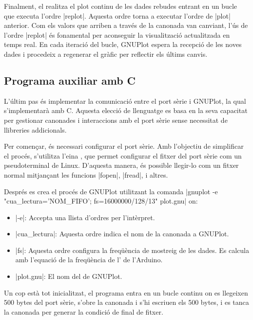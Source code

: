 \documentclass{tfgitic}[2023/06/30]
\begin{document}
Finalment, el  realitza el plot continu de les dades
rebudes entrant en un bucle que executa l'ordre \ord|replot|. Aquesta
ordre torna a executar l'ordre de \ord|plot| anterior. Com els valors
que arriben a través de la canonada van canviant, l'ús de l'ordre
\ord|replot| és fonamental per aconseguir la visualització
actualitzada en temps real. En cada iteració del bucle, GNUPlot espera
la recepció de les noves dades i procedeix a regenerar el gràfic per
reflectir els últims canvis.

\subsection{Programa auxiliar amb C}

L'últim pas és implementar la comunicació entre el port sèrie i
GNUPlot, la qual s'implementarà amb C. Aquesta elecció de llenguatge
es basa en la seva capacitat per gestionar canonades i interaccions
amb el port sèrie sense necessitat de llibreries addicionals.

\newpage

Per començar, és necessari configurar el port sèrie. Amb l'objectiu de
simplificar el procés, s'utilitza l'eina \cite[stty]{stty}, que permet
configurar el fitxer del port sèrie com un pseudoterminal de
Linux. D'aquesta manera, és possible llegir-lo com un fitxer normal
mitjançant les funcions \ord|fopen|, \ord|fread|, i altres.

Després es crea el procés de GNUPlot utilitzant la comanda
\ord|gnuplot -e "cua\_lectura='NOM\_FIFO'; fs=16000000/128/13" plot.gnu|
on:

\begin{itemize}
      \item \ord|-e|: Accepta una llista d'ordres per l'intèrpret.
      \item \ord|cua\_lectura|: Aquesta ordre indica el nom de la
        canonada a GNUPlot.
      \item \ord|fs|: Aquesta ordre configura la freqüència de
        mostreig de les dades. Es calcula amb l'equació de la
        freqüència de l' de l'Arduino.
      \item \ord|plot.gnu|: El nom del  de GNUPlot.
\end{itemize}

Un cop està tot inicialitzat, el programa entra en un bucle continu on
es llegeixen \num{500} bytes del port sèrie, s'obre la canonada i s'hi
escriuen els \num{500} bytes, i es tanca la canonada per generar la
condició de final de fitxer.
\end{document}
